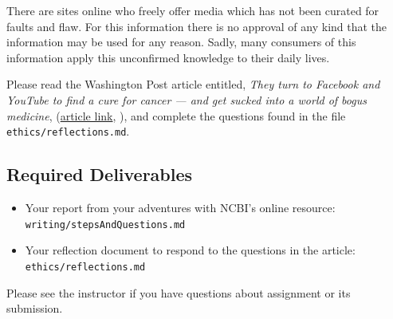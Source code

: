 {There are sites online who freely offer media which has not been curated for faults and flaw. For this information there is no approval of any kind that the information may be used for any reason. Sadly, many consumers of this information apply this unconfirmed knowledge to their daily lives.


Please read the Washington Post article entitled, \emph{They turn to Facebook and YouTube to find a cure for cancer — and get sucked into a world of bogus medicine}, (\href{https://www.washingtonpost.com/lifestyle/style/they-turn-to-facebook-and-youtube-to-find-a-cure-for-cancer--and-get-sucked-into-a-world-of-bogus-medicine/2019/06/25/6df3ddae-7cdc-11e9-a5b3-34f3edf1351e_story.html}{article link}, \cite{Ohlheiser}), and complete the questions found in the file {\tt ethics/reflections.md}.



\color{red}
\vspace*{-.2in}
\subsection*{Required Deliverables}
\vspace*{-.1in}
    \begin{itemize}
     \item Your report from your adventures with NCBI's online resource: {\tt \color{red} writing/stepsAndQuestions.md \color{black}}
     \item Your reflection document to respond to the questions in the article: {\tt \color{red} ethics/reflections.md \color{black}}
    \end{itemize}
\color{black}


\noindent Please see the instructor if you have questions about assignment or its submission.













}%

